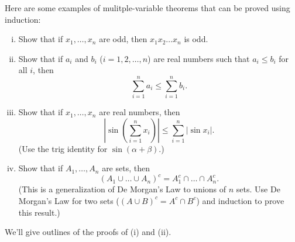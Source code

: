 \noindent
Here are some examples of mulitple-variable theorems that can be proved using induction:
\begin{enumerate}[(i)]

\item{} 
Show that if $x_1,\dots,x_n$ are odd, then $x_1x_2\dots x_n$ is odd.

\item{}
Show that if $a_i$ and $b_i$ ($i=1,2,\dots,n$) are real numbers such that 
$a_i\le b_i$ for all $i$, then 
\[
\sum_{i=1}^na_i\le \sum_{i=1}^nb_i. 
\]



\item
Show that if $x_1,\dots,x_n$ are real numbers, then
\[
\left|\sin\left(\sum_{i=1}^n x_i\right)\right|
\le \sum_{i=1}^n\left|\sin x_i\right|.
\]
(Use the trig identity for $\sin(\alpha+\beta)$.)  

\item{}
Show that if $A_1,\dots, A_n$ are sets, then 
\[
\left(A_1\cup \dots \cup A_n\right)^c
=A_1^c\cap\dots \cap A_n^c.
\]
(This is a generalization of De Morgan's Law to unions of $n$ sets.
Use De Morgan's Law for two sets ($(A\cup B)^c=A^c\cap B^c$) and induction
to prove this result.)
\end{enumerate}

We'll give outlines of the proofs of (i) and (ii).

